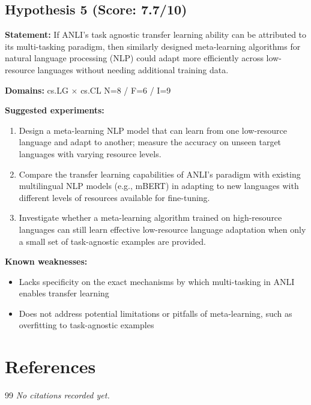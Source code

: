 \documentclass[12pt,a4paper]{article}
\begin{document}
\subsection*{Hypothesis 5 (Score: 7.7/10)}

\textbf{Statement:} If ANLI's task agnostic transfer learning ability can be attributed to its multi-tasking paradigm, then similarly designed meta-learning algorithms for natural language processing (NLP) could adapt more efficiently across low-resource languages without needing additional training data.

\noindent\textbf{Domains:} cs.LG $\times$ cs.CL
\hspace{1em} N=8 / F=6 / I=9

\textbf{Suggested experiments:}
\begin{enumerate}
  \item Design a meta-learning NLP model that can learn from one low-resource language and adapt to another; measure the accuracy on unseen target languages with varying resource levels.
  \item Compare the transfer learning capabilities of ANLI's paradigm with existing multilingual NLP models (e.g., mBERT) in adapting to new languages with different levels of resources available for fine-tuning.
  \item Investigate whether a meta-learning algorithm trained on high-resource languages can still learn effective low-resource language adaptation when only a small set of task-agnostic examples are provided.
\end{enumerate}

\textbf{Known weaknesses:}
\begin{itemize}
  \item Lacks specificity on the exact mechanisms by which multi-tasking in ANLI enables transfer learning
  \item Does not address potential limitations or pitfalls of meta-learning, such as overfitting to task-agnostic examples
\end{itemize}


\section{References}

\begin{thebibliography}{99}
\textit{No citations recorded yet.}
\end{thebibliography}
\end{document}
